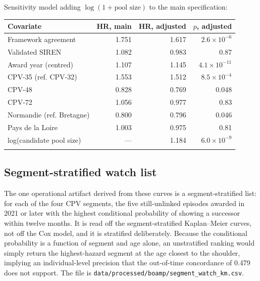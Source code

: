 Sensitivity model adding $\log(1 + \text{pool size})$ to the main specification:

\begin{longtable}[]{@{}>{\raggedright\arraybackslash}p{5.0cm}rrr@{}}
\toprule\noalign{}
Covariate & HR, main & HR, adjusted & $p$, adjusted \\
\midrule\noalign{}
\endhead
Framework agreement & 1.751 & 1.617 & $2.6\times 10^{-6}$ \\
Validated SIREN & 1.082 & 0.983 & 0.87 \\
Award year (centred) & 1.107 & 1.145 & $4.1\times 10^{-11}$ \\
CPV-35 (ref. CPV-32) & 1.553 & 1.512 & $8.5\times 10^{-4}$ \\
CPV-48 & 0.828 & 0.769 & 0.048 \\
CPV-72 & 1.056 & 0.977 & 0.83 \\
Normandie (ref. Bretagne) & 0.800 & 0.796 & 0.046 \\
Pays de la Loire & 1.003 & 0.975 & 0.81 \\
log(candidate pool size) & --- & 1.184 & $6.0\times 10^{-9}$ \\
\bottomrule\noalign{}
\end{longtable}

\subsection*{Segment-stratified watch list}

The one operational artifact derived from these curves is a segment-stratified list: for each of the four CPV
segments, the five still-unlinked episodes awarded in 2021 or later with the highest conditional probability
of showing a successor within twelve months. It is read off the segment-stratified Kaplan--Meier curves, not
off the Cox model, and it is stratified deliberately. Because the conditional probability is a function of
segment and age alone, an unstratified ranking would simply return the highest-hazard segment at the age
closest to the shoulder, implying an individual-level precision that the out-of-time concordance of 0.479
does not support. The file is
\texttt{data/processed/boamp/segment\_watch\_km.csv}.
